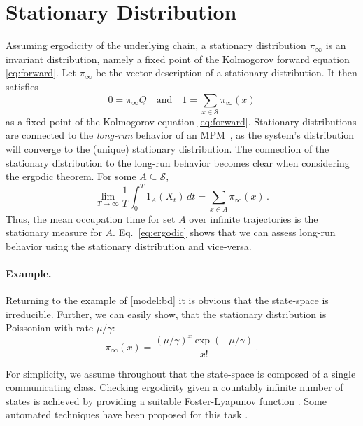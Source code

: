 \section{Stationary Distribution}\label{sec:statagg:stationary_dist}
Assuming
ergodicity  
of the underlying chain, a stationary distribution $\pi_{\infty}$ is an invariant distribution, namely a fixed point of the Kolmogorov forward equation \eqref{eq:forward}.
Let $\pi_{\infty}$ be the vector description of a stationary distribution. It then  satisfies
\begin{equation}\label{eq:stationary}
0=\pi_{\infty}Q\quad\text{and}\quad 1=\sum_{x\in\mathcal{S}}\pi_{\infty}(x)
\end{equation}
as a fixed point of the Kolmogorov equation \eqref{eq:forward}.
Stationary distributions are connected to the \emph{long-run} behavior of an \ac{MPM}~\cite{dayar2011bounding}, as the system's distribution will converge to the (unique)
stationary distribution.
The connection of the stationary distribution to the long-run behavior becomes clear when considering the ergodic theorem. 
For some $A\subseteq\mathcal{S}$,
\begin{equation}\label{eq:ergodic}
    \lim_{T\to\infty}\frac{1}{T}\int_0^T 1_A(X_t)\,dt
    = \sum_{x\in A}\pi_{\infty}(x)\,.
\end{equation}
Thus, the mean occupation time for set $A$ over infinite trajectories is the stationary measure for $A$.
Eq.~\eqref{eq:ergodic} shows that we can assess long-run behavior using the stationary distribution and vice-versa.

\paragraph{Example.} Returning to the example of \autoref{model:bd} it is obvious that the state-space is irreducible.
Further, we can easily show, that the stationary distribution is Poissonian with rate $\mu/\gamma$:
$$ \pi_{\infty}(x)=\frac{{(\mu/\gamma)}^{x}\exp(-\mu/\gamma)}{x!}\,.$$


For simplicity, we assume throughout that the state-space is composed of a single communicating class.
Checking ergodicity given a countably infinite number of states is achieved by providing a suitable Foster-Lyapunov function \cite{meyn2012markov}.
Some automated techniques have been proposed for this task \cite{dayar2011bounding,gupta2014scalable,milias2014optimization}.



